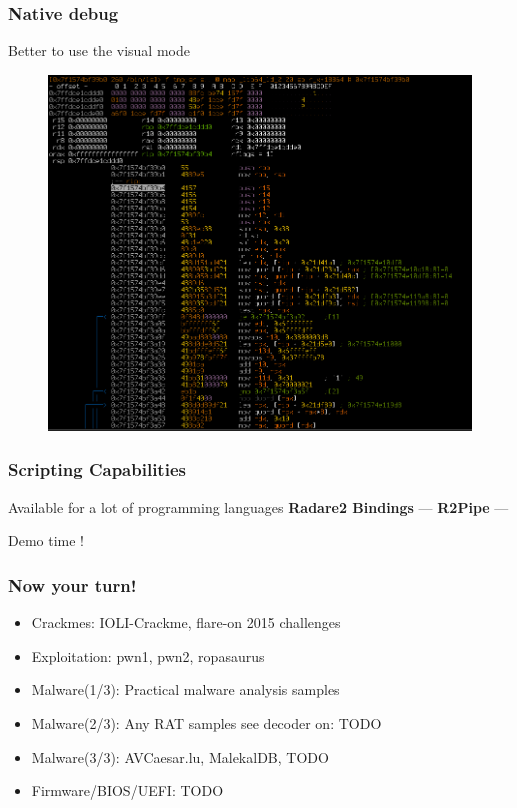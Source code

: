 \documentclass[10pt, compress]{beamer}
\begin{document}
\begin{frame}[fragile]
  \frametitle{Native debug}
  \center Better to use the visual mode
  \begin{figure}
  \includegraphics[width=\textwidth]{r2-nativedebug.png}
  \end{figure}
\end{frame}

\begin{frame}[fragile]
  \frametitle{Scripting Capabilities}
  \center Available for a lot of programming languages
  \center\textbf{Radare2 Bindings} —
  \center\textbf{R2Pipe} —
  \noindent\makebox[\linewidth]{\rule{\paperwidth}{0.4pt}}
  \item Demo time !
\end{frame}

\begin{frame}[fragile]
  \frametitle{Now your turn!}
    \begin{itemize}
    \item \alert{Crackmes:} IOLI-Crackme, flare-on 2015 challenges
    \item \alert{Exploitation:} pwn1, pwn2, ropasaurus
    \item \alert{Malware(1/3):} Practical malware analysis samples
    \item \alert{Malware(2/3):} Any RAT samples see decoder on: TODO
    \item \alert{Malware(3/3):} AVCaesar.lu, MalekalDB, TODO
    \item \alert{Firmware/BIOS/UEFI:} TODO
    \end{itemize}
\end{frame}
\end{document}
